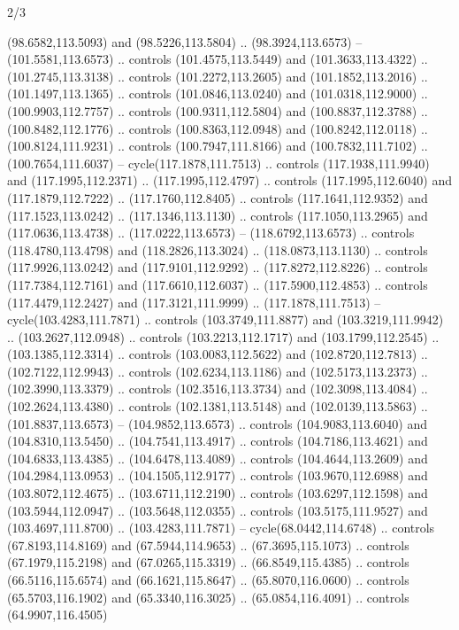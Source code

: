 \begin{flagdescription}{2/3}
\begin{scope}[shift={(0.5\flaglength,0.5)},scale=\flagwidth/320]
\begin{scope}[y=0.8pt, x=0.8pt, yscale=-1,shift={(-118.3,-146)}]
  (98.6582,113.5093) and (98.5226,113.5804) .. (98.3924,113.6573) --
  (101.5581,113.6573) .. controls (101.4575,113.5449) and (101.3633,113.4322) ..
  (101.2745,113.3138) .. controls (101.2272,113.2605) and (101.1852,113.2016) ..
  (101.1497,113.1365) .. controls (101.0846,113.0240) and (101.0318,112.9000) ..
  (100.9903,112.7757) .. controls (100.9311,112.5804) and (100.8837,112.3788) ..
  (100.8482,112.1776) .. controls (100.8363,112.0948) and (100.8242,112.0118) ..
  (100.8124,111.9231) .. controls (100.7947,111.8166) and (100.7832,111.7102) ..
  (100.7654,111.6037) -- cycle(117.1878,111.7513) .. controls
  (117.1938,111.9940) and (117.1995,112.2371) .. (117.1995,112.4797) .. controls
  (117.1995,112.6040) and (117.1879,112.7222) .. (117.1760,112.8405) .. controls
  (117.1641,112.9352) and (117.1523,113.0242) .. (117.1346,113.1130) .. controls
  (117.1050,113.2965) and (117.0636,113.4738) .. (117.0222,113.6573) --
  (118.6792,113.6573) .. controls (118.4780,113.4798) and (118.2826,113.3024) ..
  (118.0873,113.1130) .. controls (117.9926,113.0242) and (117.9101,112.9292) ..
  (117.8272,112.8226) .. controls (117.7384,112.7161) and (117.6610,112.6037) ..
  (117.5900,112.4853) .. controls (117.4479,112.2427) and (117.3121,111.9999) ..
  (117.1878,111.7513) -- cycle(103.4283,111.7871) .. controls
  (103.3749,111.8877) and (103.3219,111.9942) .. (103.2627,112.0948) .. controls
  (103.2213,112.1717) and (103.1799,112.2545) .. (103.1385,112.3314) .. controls
  (103.0083,112.5622) and (102.8720,112.7813) .. (102.7122,112.9943) .. controls
  (102.6234,113.1186) and (102.5173,113.2373) .. (102.3990,113.3379) .. controls
  (102.3516,113.3734) and (102.3098,113.4084) .. (102.2624,113.4380) .. controls
  (102.1381,113.5148) and (102.0139,113.5863) .. (101.8837,113.6573) --
  (104.9852,113.6573) .. controls (104.9083,113.6040) and (104.8310,113.5450) ..
  (104.7541,113.4917) .. controls (104.7186,113.4621) and (104.6833,113.4385) ..
  (104.6478,113.4089) .. controls (104.4644,113.2609) and (104.2984,113.0953) ..
  (104.1505,112.9177) .. controls (103.9670,112.6988) and (103.8072,112.4675) ..
  (103.6711,112.2190) .. controls (103.6297,112.1598) and (103.5944,112.0947) ..
  (103.5648,112.0355) .. controls (103.5175,111.9527) and (103.4697,111.8700) ..
  (103.4283,111.7871) -- cycle(68.0442,114.6748) .. controls (67.8193,114.8169)
  and (67.5944,114.9653) .. (67.3695,115.1073) .. controls (67.1979,115.2198)
  and (67.0265,115.3319) .. (66.8549,115.4385) .. controls (66.5116,115.6574)
  and (66.1621,115.8647) .. (65.8070,116.0600) .. controls (65.5703,116.1902)
  and (65.3340,116.3025) .. (65.0854,116.4091) .. controls (64.9907,116.4505)

\end{scope}
\end{scope}
\end{flagdescription}
